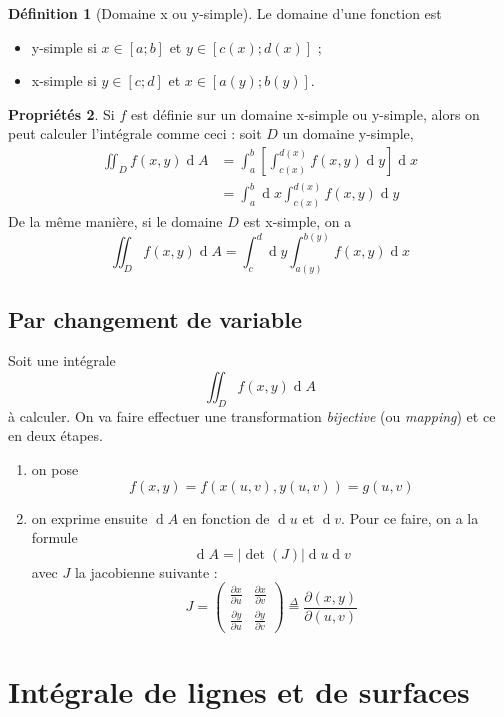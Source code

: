 \documentclass[11pt,a4paper]{article}
\theoremstyle{definition}
\newtheorem{mydef}{Définition}%
\newtheorem{myprop}[mydef]{Propriétés}
\DeclareMathOperator{\newdet}{det}
\DeclareMathOperator{\diff}{d}
\newcommand{\dif}{\diff\!}
\newcommand{\pa}{\partial}
\begin{document}
\begin{mydef}[Domaine x ou y-simple]
	Le domaine d'une fonction est
	\begin{itemize}
		\item y-simple si $x \in [a;b]$ et $y \in [c(x);d(x)]$ ;
		\item x-simple si $y \in [c;d]$ et $x \in [a(y);b(y)]$.
	\end{itemize}
\end{mydef}

\begin{myprop} Si $f$ est définie sur un domaine x-simple ou y-simple, alors on peut calculer l'intégrale comme ceci : soit $D$ un domaine y-simple,
	\begin{align*} \iint_D f(x,y)\dif A & = \int_a^b \left[ \int_{c(x)}^{d(x)} f(x,y) \dif y \right] \dif x \\
		& = \int_a^b \dif x \int_{c(x)}^{d(x)} f(x,y) \dif y
	\end{align*}
	De la même manière, si le domaine $D$ est x-simple, on a
	\[ \iint_D f(x,y)\dif A  = \int_c^d \dif y \int_{a(y)}^{b(y)} f(x,y) \dif x \]
\end{myprop}

\subsection{Par changement de variable}
Soit une intégrale
\[ \iint_D f(x,y) \dif A \]
à calculer. On va faire effectuer une transformation \emph{bijective} (ou \emph{mapping}) et ce en deux étapes.
\begin{enumerate}
	\item on pose
		\[ f(x,y) = f(x(u,v),y(u,v)) = g(u,v) \]
	\item on exprime ensuite $\dif A$ en fonction de $\dif u$ et $\dif v$. Pour ce faire, on a la formule
		\[ \dif A = |\newdet(J)| \dif u \dif v \]
		avec $J$ la jacobienne suivante :
		\[ J =
		\begin{pmatrix}
			\frac{\pa x}{\pa u} & \frac{\pa x}{\pa v} \\ \frac{\pa y}{\pa u} & \frac{\pa y}{\pa v}
		\end{pmatrix}
		\overset{\Delta}{=} \frac{\pa(x,y)}{\pa (u,v)} \]
\end{enumerate}

\section{Intégrale de lignes et de surfaces}
\end{document}
